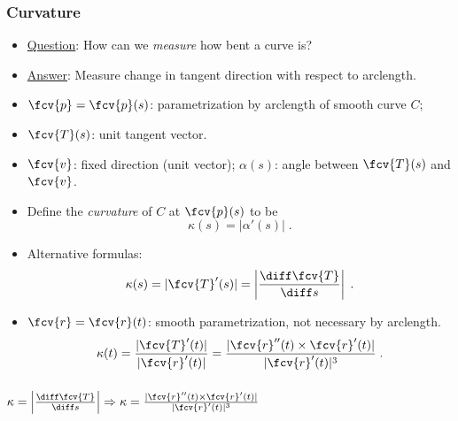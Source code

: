 \begin{frame}
\frametitle{Curvature}
\begin{itemize}
\item \underline{Question}: How can we \emph{measure} how bent a curve is?
\item<2-> \underline{Answer}: Measure change in tangent direction with respect to arclength.
\item<3-> $\fcv{p}=\fcv{p}(s)$: parametrization by arclength of smooth curve $C$;
\item<4-> $\fcv{T}(s)$: unit tangent vector.
\item<5-> $\fcv{v}$: fixed direction (unit vector); $\alpha(s)$: angle between $\fcv{T}(s)$ and $\fcv{v}$.
\item<6-> Define the \emph{curvature} of $C$ at $\fcv{p}(s)$ to be
\[\kappa(s) = \left| \alpha'(s) \right|\; .
\]
\item<7-> Alternative formulas: \[\kappa(s) = | \fcv{T}'(s) | = \left| \frac{\diff\fcv{T}}{\diff s}\right| \; .\]
\item<8-> $\fcv{r}=\fcv{r}(t)$: smooth parametrization, not necessary by arclength.
\[\kappa(t) = \frac{|\fcv{T}'(t)|}{|\fcv{r}'(t)|} = \frac{|\fcv{r}''(t) \times \fcv{r}'(t)|}{|\fcv{r}'(t)|^3}\; .
\]
\end{itemize} 
\end{frame}

\begin{frame}
\frametitle {$\kappa  = \left| \frac{\diff\fcv{T}}{\diff s}\right|\Rightarrow \kappa=\frac{|\fcv{r}''(t) \times \fcv{r}'(t)|}{|\fcv{r}'(t)|^3}$}
\end{frame}